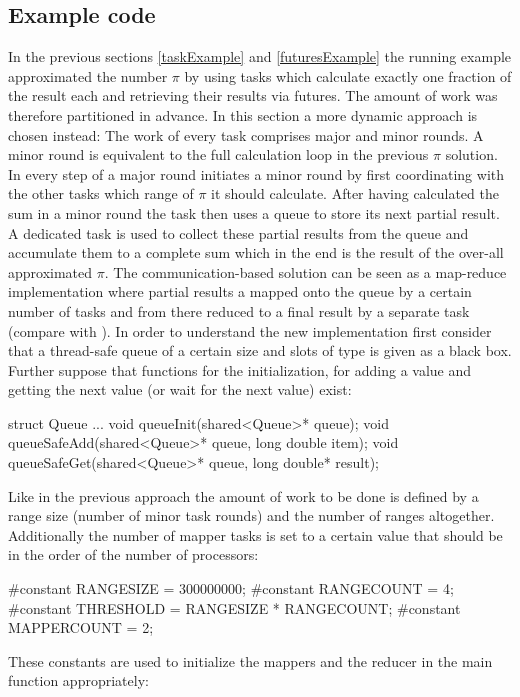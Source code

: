 \subsection{Example code}
\label{sharedMemoryExample}
In the previous sections \ref{taskExample} and \ref{futuresExample} the running example approximated the number $\pi$ by using tasks which calculate exactly one fraction of the result each and retrieving their results via futures. The amount of work was therefore partitioned in advance. In this section a more dynamic approach is chosen instead: The work of every task comprises major and minor rounds. A minor round is equivalent to the full calculation loop in the previous $\pi$ solution. In every step of a major round initiates a minor round by first coordinating with the other tasks which range of $\pi$ it should calculate. After having calculated the sum in a minor round the task then uses a queue to store its next partial result. A dedicated task is used to collect these partial results from the queue and accumulate them to a complete sum which in the end is the result of the over-all approximated $\pi$. The communication-based solution can be seen as a map-reduce implementation where partial results a mapped onto the queue by a certain number of tasks and from there reduced to a final result by a separate task (compare with \cite{MapReduce}).
In order to understand the new implementation first consider that a thread-safe queue of a certain size and slots of type  is given as a black box. Further suppose that functions for the initialization, for adding a value and getting the next value (or wait for the next value) exist:
\begin{ccode}
struct Queue {...}
void queueInit(shared<Queue>* queue);
void queueSafeAdd(shared<Queue>* queue, long double item);
void queueSafeGet(shared<Queue>* queue, long double* result);
\end{ccode}
Like in the previous approach the amount of work to be done is defined by a range size (number of minor task rounds) and the number of ranges altogether. Additionally the number of mapper tasks is set to a certain value that should be in the order of the number of processors:
\begin{ccode}
#constant RANGESIZE = 300000000; 
#constant RANGECOUNT = 4; 
#constant THRESHOLD = RANGESIZE * RANGECOUNT; 
#constant MAPPERCOUNT = 2;
\end{ccode}
These constants are used to initialize the mappers and the reducer in the main function appropriately:
